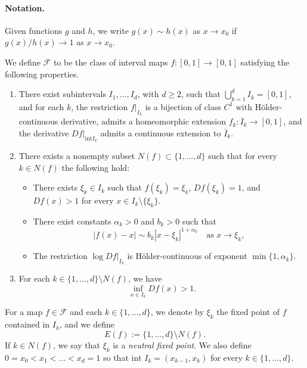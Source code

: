 \documentclass[12pt]{amsart}
\numberwithin{equation}{section} %
\numberwithin{figure}{section} %
\theoremstyle{plain}
\theoremstyle{definition}
\theoremstyle{remark}
\theoremstyle{citing}
\newcommand{\sF}{\mathscr{F}}
\renewcommand{\=}{\coloneqq}
\begin{document}
\paragraph{\textbf{Notation.}} Given functions $g$ and $h$, we write $g(x)\sim h(x)$ as $x\to x_0$ if $g(x)/h(x)\to 1$ as $x\to x_0$.

We define $\sF$ to be the class of interval maps $f\colon[0,1]\to[0,1]$ satisfying the following properties.

\begin{enumerate}[label=\textbf{P\arabic*.}, ref=P\arabic*]
\item\label{itm P1} There exist subintervals $I_1,\ldots,I_d$, with $d\geq 2$, such that $\bigcup_{k=1}^d I_k = [0,1]$, and for each $k$, the restriction $f|_{I_k}$ is a bijection of class $C^1$ with Hölder-continuous derivative, admits a homeomorphic extension $f_k\colon \overline{I}_k \to [0,1]$, and the derivative $Df|_{\text{int}I_k}$ admits a continuous extension to $\overline{I}_k$.

\item\label{itm P2} There exists a nonempty subset $N(f)\subset \{1,\ldots,d\}$ such that for every $k\in N(f)$ the following hold:
\begin{itemize}
\item[(1)] There exists $\xi_k\in I_k$ such that $f(\xi_k)=\xi_k$, $Df(\xi_k)=1$, and $Df(x)>1$ for every $x\in I_k\setminus\{\xi_k\}$.

\item[(2)] There exist constants $\alpha_k>0$ and $b_k>0$ such that
\begin{equation}
|f(x)-x| \sim b_k |x-\xi_k|^{1+\alpha_k} \quad \text{as } x\to\xi_k,
\end{equation}
\item[(3)] The restriction $\log Df|_{I_k}$ is Hölder-continuous of exponent $\min\{1,\alpha_k\}$.
\end{itemize}

\item\label{itm P3} For each $k\in \{1,\ldots,d\}\setminus N(f)$, we have 
$$
\inf_{x\in I_k}Df(x)>1.
$$
\end{enumerate}

For a map $f\in \mathscr{F}$ and each $k\in \{1,\ldots,d\}$, we denote by $\xi_k$ the fixed point of $f$ contained in $I_k$, and we define
\[
E(f) := \{1,\ldots,d\}\setminus N(f).
\]
If $k\in N(f)$, we say that $\xi_k$ is a \emph{neutral fixed point}.
We also define $0= x_0 <x_1<\dots<x_d=1$  so that $\text{int } I_k =(x_{k-1},x_k)$ for every $k\in\{1,\dots,d\}$.
\end{document}
